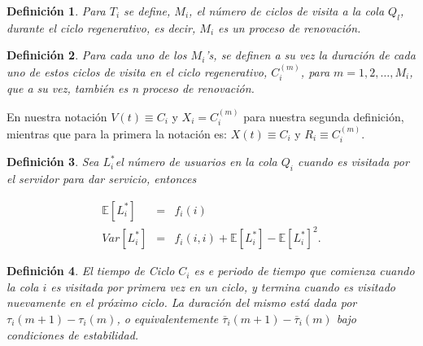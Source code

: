 \documentclass{article}
\newtheorem{Def}{Definición}
\newcommand{\esp}{\mathbb{E}}
\begin{document}
\begin{Def}
Para $T_{i}$ se define, $M_{i}$, el n\'umero de ciclos de visita a la cola $Q_{l}$, durante el ciclo regenerativo, es decir, $M_{i}$ es un proceso de renovaci\'on.
\end{Def}

\begin{Def}
Para cada uno de los $M_{i}$'s, se definen a su vez la duraci\'on de cada uno de estos ciclos de visita en el ciclo regenerativo, $C_{i}^{(m)}$, para $m=1,2,\ldots,M_{i}$, que a su vez, tambi\'en es n proceso de renovaci\'on.
\end{Def}

En nuestra notaci\'on $V\left(t\right)\equiv C_{i}$ y $X_{i}=C_{i}^{(m)}$ para nuestra segunda definici\'on, mientras que para la primera la notaci\'on es: $X\left(t\right)\equiv C_{i}$ y $R_{i}\equiv C_{i}^{(m)}$.




\begin{Def}
Sea $L_{i}^{*}$el n\'umero de usuarios en la cola $Q_{i}$ cuando es visitada por el servidor para dar servicio, entonces

\begin{eqnarray}
\esp\left[L_{i}^{*}\right]&=&f_{i}\left(i\right)\\
Var\left[L_{i}^{*}\right]&=&f_{i}\left(i,i\right)+\esp\left[L_{i}^{*}\right]-\esp\left[L_{i}^{*}\right]^{2}.
\end{eqnarray}

\end{Def}

\begin{Def}
El tiempo de Ciclo $C_{i}$ es e periodo de tiempo que comienza cuando la cola $i$ es visitada por primera vez en un ciclo, y termina cuando es visitado nuevamente en el pr\'oximo ciclo. La duraci\'on del mismo est\'a dada por $\tau_{i}\left(m+1\right)-\tau_{i}\left(m\right)$, o equivalentemente $\overline{\tau}_{i}\left(m+1\right)-\overline{\tau}_{i}\left(m\right)$ bajo condiciones de estabilidad.
\end{Def}
\end{document}
